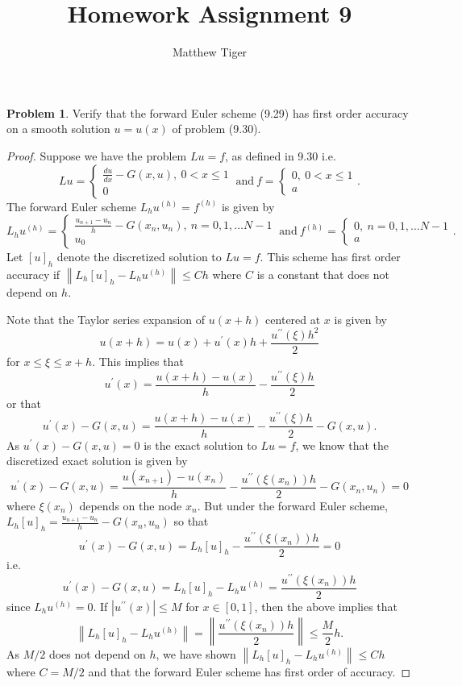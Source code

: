 \documentclass[12pt]{article}
\title{Homework Assignment 9}
\author{Matthew Tiger}
\theoremstyle{definition}
\newtheorem{problem}{Problem}
\newcommand\norm[1]{\left\lVert#1\right\rVert}
\begin{document}
\maketitle
\begin{problem} Verify that the forward Euler scheme (9.29) has first order
  accuracy on a smooth solution $u=u(x)$ of problem (9.30).
\end{problem}

\begin{proof}
  Suppose we have the problem $Lu = f$, as defined in 9.30 i.e.
  \[
      Lu =
      \begin{cases}
        \frac{du}{dx} - G(x, u),\ 0 < x \leq 1 \\
        0
      \end{cases}
      \ \text{and} \
      f =
      \begin{cases}
        0,\ 0 < x \leq 1 \\
        a
      \end{cases}.
  \]
  The forward Euler scheme $L_hu^{(h)} = f^{(h)}$ is given by
  \[
      L_hu^{(h)} =
      \begin{cases}
        \frac{u_{n+1} - u_{n}}{h} - G(x_n, u_n),\  n = 0, 1, \dots N-1 \\
        u_0
      \end{cases}
      \ \text{and} \
      f^{(h)} =
      \begin{cases}
        0,\  n = 0, 1, \dots N-1 \\
        a
      \end{cases}.
  \]
  Let $[u]_h$ denote the discretized solution to $Lu = f$. This scheme has
  first order accuracy if $\norm{L_h[u]_h - L_hu^{(h)}} \leq C h$ where
  $C$ is a constant that does not depend on $h$.

  Note that the Taylor series expansion of $u(x + h)$ centered at $x$ is given by
  \[
    u(x + h) = u(x) + u^{\prime}(x) h + \frac{u^{\prime \prime}(\xi) h^2}{2}
  \]
  for $x \leq \xi \leq x+h$. This implies that
  \[
    u^{\prime}(x) = \frac{u(x+h) - u(x)}{h} - \frac{u^{\prime \prime}(\xi) h}{2}
  \]
  or that
  \[
    u^{\prime}(x) - G(x, u) = \frac{u(x+h) - u(x)}{h} - \frac{u^{\prime \prime}(\xi) h}{2} - G(x, u).
  \]
  As $u^{\prime}(x) - G(x, u) = 0$ is the exact solution to $Lu = f$, we know that the
  discretized exact solution is given by
  \[
    u^{\prime}(x) - G(x, u) = \frac{u(x_{n+1}) - u(x_n)}{h} - \frac{u^{\prime \prime}(\xi(x_n)) h}{2} - G(x_n, u_n) = 0
  \]
  where $\xi(x_n)$ depends on the node $x_n$. But under the forward Euler scheme,
  $L_h[u]_h = \frac{u_{n+1} - u_{n}}{h} - G(x_n, u_n)$ so that
  \[
    u^{\prime}(x) - G(x, u) = L_h[u]_h - \frac{u^{\prime \prime}(\xi(x_n)) h}{2} = 0
  \]
  i.e.
  \[
    u^{\prime}(x) - G(x, u) = L_h[u]_h - L_h u^{(h)} = \frac{u^{\prime \prime}(\xi(x_n)) h}{2}
  \]
  since $L_h u^{(h)} = 0$. If $|u^{\prime \prime}(x)| \leq M$ for $x \in [0, 1]$, then
  the above implies that
  \[
    \norm{L_h[u]_h - L_h u^{(h)}} = \norm{\frac{u^{\prime \prime}(\xi(x_n)) h}{2}} \leq \frac{M}{2} h.
  \]
  As $M/2$ does not depend on $h$, we have shown $\norm{L_h[u]_h - L_h u^{(h)}} \leq C h$
  where $C = M/2$ and that the forward Euler scheme has first order of accuracy.
\end{proof}
\end{document}
